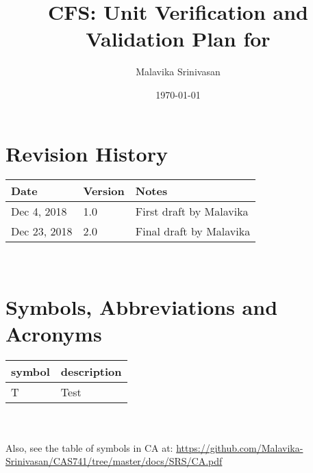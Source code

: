 \documentclass[12pt, titlepage]{article}
\begin{document}
\title{CFS: Unit Verification and Validation Plan for \famname{}} 
\author{Malavika Srinivasan}
\date{\today}
	
\maketitle


\section{Revision History}

\begin{tabularx}{\textwidth}{p{3cm}p{2cm}X}
\toprule {\bf Date} & {\bf Version} & {\bf Notes}\\
\midrule
Dec 4, 2018 & 1.0 & First draft by Malavika\\
Dec 23, 2018 & 2.0 & Final draft by Malavika\\
\bottomrule
\end{tabularx}

~\newpage

\tableofcontents





\newpage

\section{Symbols, Abbreviations and Acronyms}

\renewcommand{\arraystretch}{1.2}
\begin{tabular}{l l} 
	\toprule		
	\textbf{symbol} & \textbf{description}\\
	\midrule 
	T & Test\\
	\bottomrule
\end{tabular}\\
\\



Also, see the table of symbols in CA at: 
\url{https://github.com/Malavika-Srinivasan/CAS741/tree/master/docs/SRS/CA.pdf}
\\


\newpage

\end{document}
